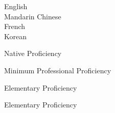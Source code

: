 \vspace*{4pt}
{
	\hspace*{9pt}
	\begin{minipage}[t]{0.30\textwidth}
		English\\
		Mandarin Chinese\\
		French\\
		Korean
	\end{minipage}
	\begin{minipage}[t]{0.20\textwidth}
	\end{minipage}
	\begin{minipage}[t]{0.63\textwidth}
		\hfill Native Proficiency

		\hfill Minimum Professional Proficiency

		\hfill Elementary Proficiency

		\hfill Elementary Proficiency
	\end{minipage}
}

\vspace{4pt}